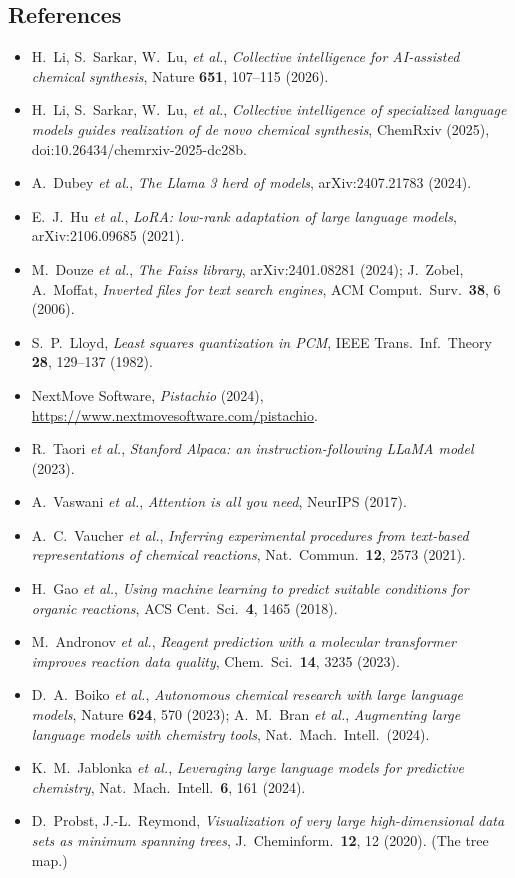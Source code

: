 \documentclass[11pt]{article}
\begin{document}
\subsection*{References}
{\small\sloppy
\begin{itemize}[nosep, leftmargin=1.2em]
  \item H.~Li, S.~Sarkar, W.~Lu, \emph{et al.}, \textit{Collective intelligence for AI-assisted chemical synthesis}, Nature \textbf{651}, 107--115 (2026).
  \item H.~Li, S.~Sarkar, W.~Lu, \emph{et al.}, \textit{Collective intelligence of specialized language models guides realization of de novo chemical synthesis}, ChemRxiv (2025), doi:10.26434/chemrxiv-2025-dc28b.
  \item A.~Dubey \emph{et al.}, \textit{The Llama 3 herd of models}, arXiv:2407.21783 (2024).
  \item E.~J.~Hu \emph{et al.}, \textit{LoRA: low-rank adaptation of large language models}, arXiv:2106.09685 (2021).
  \item M.~Douze \emph{et al.}, \textit{The Faiss library}, arXiv:2401.08281 (2024); J.~Zobel, A.~Moffat, \textit{Inverted files for text search engines}, ACM Comput.\ Surv.\ \textbf{38}, 6 (2006).
  \item S.~P.~Lloyd, \textit{Least squares quantization in PCM}, IEEE Trans.\ Inf.\ Theory \textbf{28}, 129--137 (1982).
  \item NextMove Software, \textit{Pistachio} (2024), \url{https://www.nextmovesoftware.com/pistachio}.
  \item R.~Taori \emph{et al.}, \textit{Stanford Alpaca: an instruction-following LLaMA model} (2023).
  \item A.~Vaswani \emph{et al.}, \textit{Attention is all you need}, NeurIPS (2017).
  \item A.~C.~Vaucher \emph{et al.}, \textit{Inferring experimental procedures from text-based representations of chemical reactions}, Nat.\ Commun.\ \textbf{12}, 2573 (2021).
  \item H.~Gao \emph{et al.}, \textit{Using machine learning to predict suitable conditions for organic reactions}, ACS Cent.\ Sci.\ \textbf{4}, 1465 (2018).
  \item M.~Andronov \emph{et al.}, \textit{Reagent prediction with a molecular transformer improves reaction data quality}, Chem.\ Sci.\ \textbf{14}, 3235 (2023).
  \item D.~A.~Boiko \emph{et al.}, \textit{Autonomous chemical research with large language models}, Nature \textbf{624}, 570 (2023); A.~M.~Bran \emph{et al.}, \textit{Augmenting large language models with chemistry tools}, Nat.\ Mach.\ Intell.\ (2024).
  \item K.~M.~Jablonka \emph{et al.}, \textit{Leveraging large language models for predictive chemistry}, Nat.\ Mach.\ Intell.\ \textbf{6}, 161 (2024).
  \item D.~Probst, J.-L.~Reymond, \textit{Visualization of very large high-dimensional data sets as minimum spanning trees}, J.\ Cheminform.\ \textbf{12}, 12 (2020). (The tree map.)
\end{itemize}}
\end{document}
